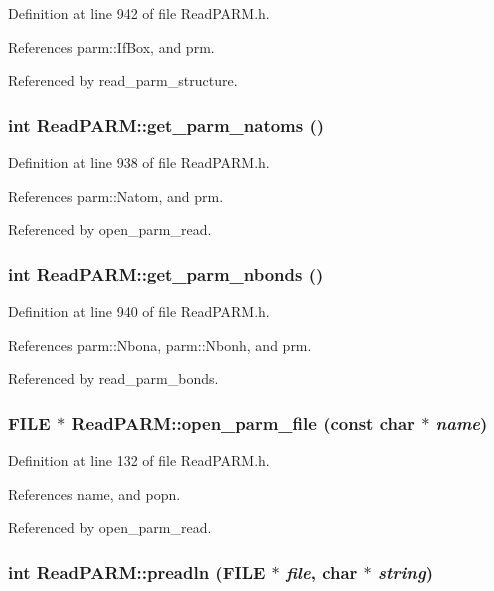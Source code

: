 Definition at line 942 of file Read\-PARM.h.

References parm::If\-Box, and prm.

Referenced by read\_\-parm\_\-structure.
\subsubsection{\setlength{\rightskip}{0pt plus 5cm}int Read\-PARM::get\_\-parm\_\-natoms ()}\label{classReadPARM_a10}




Definition at line 938 of file Read\-PARM.h.

References parm::Natom, and prm.

Referenced by open\_\-parm\_\-read.
\subsubsection{\setlength{\rightskip}{0pt plus 5cm}int Read\-PARM::get\_\-parm\_\-nbonds ()}\label{classReadPARM_a11}




Definition at line 940 of file Read\-PARM.h.

References parm::Nbona, parm::Nbonh, and prm.

Referenced by read\_\-parm\_\-bonds.
\subsubsection{\setlength{\rightskip}{0pt plus 5cm}FILE $\ast$ Read\-PARM::open\_\-parm\_\-file (const char $\ast$ {\em name})}\label{classReadPARM_a2}




Definition at line 132 of file Read\-PARM.h.

References name, and popn.

Referenced by open\_\-parm\_\-read.
\subsubsection{\setlength{\rightskip}{0pt plus 5cm}int Read\-PARM::preadln (FILE $\ast$ {\em file}, char $\ast$ {\em string})}\label{classReadPARM_a5}




